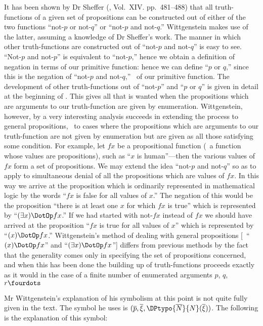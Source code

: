 It has been shown by Dr Sheffer (,
Vol.~XIV. pp.~481--488) that all truth-functions of a given
set of propositions can be constructed out of either of
the two functions ``not-$p$ or not-$q$'' or ``not-$p$ and not-$q$.''
Wittgenstein makes use of the latter, assuming a knowledge
of Dr Sheffer's work. The manner in which other
truth-functions are constructed out of ``not-$p$ and not-$q$''
is easy to see. ``Not-$p$ and not-$p$'' is equivalent to
``not-$p$,'' hence we obtain a definition of negation in terms
of our primitive function: hence we can define ``$p$ or $q$,''
since this is the negation of ``not-$p$ and not-$q$,'' \idEst\ of
our primitive function. The development of other truth-functions
out of ``not-$p$'' and ``$p$ or $q$'' is given in detail
at the beginning of . This gives all
that is wanted when the propositions which are arguments
to our truth-function are given by enumeration. Wittgenstein,
however, by a very interesting analysis succeeds in
extending the process to general propositions, \idEst\ to cases
where the propositions which are arguments to our truth-function
are not given by enumeration but are given as
all those satisfying some condition. For example, let $fx$
be a propositional function (\idEst\ a function whose values
are propositions), such as ``$x$ is human''---then the various
values of $fx$ form a set of propositions. We may extend
the idea ``not-$p$ and not-$q$'' so as to apply to simultaneous
denial of all the propositions which are values of $fx$. In
this way we arrive at the proposition which is ordinarily
represented in mathematical logic by the words ``$fx$
is false for all values of $x$.'' The negation of this would
be the proposition ``there is at least one $x$ for which $fx$ is
true'' which is represented by ``$(\exists x) \DotOp fx$.'' If we had
started with not-$fx$ instead of $fx$ we should have arrived
at the proposition ``$fx$ is true for all values of $x$'' which
is represented by ``$(x) \DotOp fx$.'' Wittgenstein's method of
dealing with general propositions [\idEst\ ``$(x) \DotOp fx$'' and
``$(\exists x) \DotOp fx$''] differs from previous methods by the fact
that the generality comes only in specifying the set of
propositions concerned, and when this has been done the
building up of truth-functions proceeds exactly as it would
in the case of a finite number of enumerated arguments
$p$, $q$, $r\fourdots$

Mr Wittgenstein's explanation of his symbolism at
this point is not quite fully given in the text. The symbol
he uses is $(\overline{p}, \overline{\xi}, \DPtypo{\overline{N}}{N}(\overline{\xi}))$. The following is the explanation
of this symbol:

